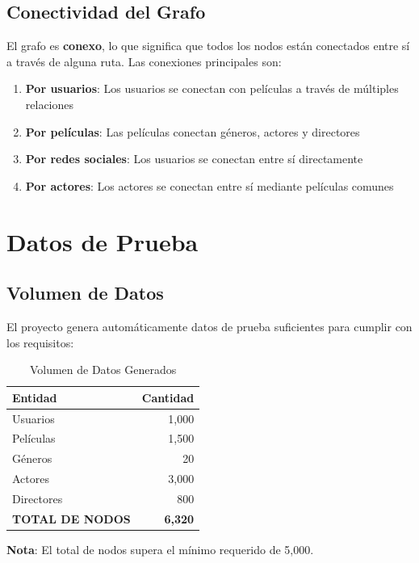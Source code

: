\documentclass[12pt]{article}
\begin{document}
\subsection{Conectividad del Grafo}

El grafo es \textbf{conexo}, lo que significa que todos los nodos están conectados entre sí a través de alguna ruta. Las conexiones principales son:

\begin{enumerate}
    \item \textbf{Por usuarios}: Los usuarios se conectan con películas a través de múltiples relaciones
    \item \textbf{Por películas}: Las películas conectan géneros, actores y directores
    \item \textbf{Por redes sociales}: Los usuarios se conectan entre sí directamente
    \item \textbf{Por actores}: Los actores se conectan entre sí mediante películas comunes
\end{enumerate}

\newpage
\section{Datos de Prueba}

\subsection{Volumen de Datos}

El proyecto genera automáticamente datos de prueba suficientes para cumplir con los requisitos:

\begin{table}[h]
\centering
\begin{tabular}{|l|r|}
\hline
\textbf{Entidad} & \textbf{Cantidad} \\
\hline
Usuarios & 1,000 \\
Películas & 1,500 \\
Géneros & 20 \\
Actores & 3,000 \\
Directores & 800 \\
\hline
\textbf{TOTAL DE NODOS} & \textbf{6,320} \\
\hline
\end{tabular}
\caption{Volumen de Datos Generados}
\end{table}

\textbf{Nota}: El total de nodos supera el mínimo requerido de 5,000.
\end{document}

